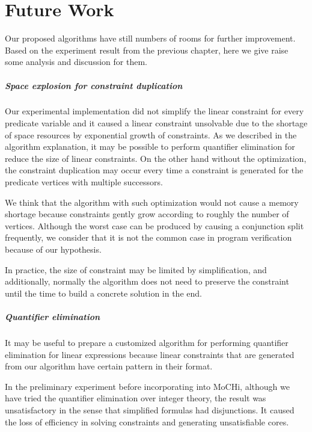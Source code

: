 ﻿\chapter{Future Work}
\label{chap:future}

Our proposed algorithms have still numbers of rooms for further
improvement.  Based on the experiment result from the previous
chapter, here we give raise some analysis and discussion for them.


\paragraph{Space explosion for constraint duplication}
Our experimental implementation did not simplify the linear constraint
for every predicate variable and it caused a linear constraint
unsolvable due to the shortage of space resources by exponential
growth of constraints.  As we described in the algorithm explanation,
it may be possible to perform quantifier elimination for reduce the
size of linear constraints.  On the other hand without the
optimization, the constraint duplication may occur every time a
constraint is generated for the predicate vertices with multiple
successors.

We think that the algorithm with such optimization would not cause a
memory shortage because constraints gently grow according to roughly
the number of vertices.  Although the worst case can be produced by
causing a conjunction split frequently, we consider that it is not the
common case in program verification because of our hypothesis.

In practice, the size of constraint may be limited by simplification,
and additionally, normally the algorithm does not need to preserve the
constraint until the time to build a concrete solution in the end.


\paragraph{Quantifier elimination}
It may be useful to prepare a customized algorithm for performing
quantifier elimination for linear expressions because linear
constraints that are generated from our algorithm have certain pattern
in their format.

In the preliminary experiment before incorporating into MoCHi, although
we have tried the quantifier elimination over integer theory, the
result was unsatisfactory in the sense that simplified formulas had
disjunctions.  It caused the loss of efficiency in solving constraints
and generating unsatisfiable cores.

